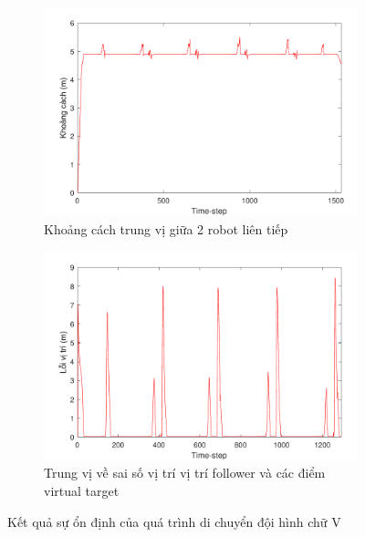 \begin{figure}
\centering
    \begin{subfigure}[b]{0.8\textwidth}
    \centering
    \includegraphics[width=\textwidth]{chapter5/image/Median_Dis.pdf}
    \caption{Khoảng cách trung vị giữa 2 robot liên tiếp}
    \label{fig:Distance5Robot}
    \end{subfigure}
    \begin{subfigure}[b]{0.8\textwidth}
    \centering
    \includegraphics[width=\textwidth]{chapter5/image/Median_Err.pdf}
    \caption{Trung vị về sai số vị trí vị trí follower và các điểm virtual target}
    \label{fig:err5Robot}
    \end{subfigure}
    \caption{Kết quả sự ổn định của quá trình di chuyển đội hình chữ V}
    \label{fig:5Ro}
\end{figure}


